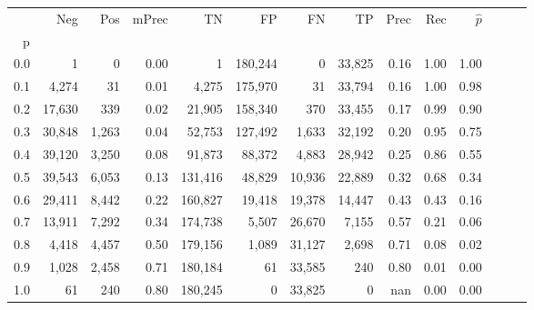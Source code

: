 \begin{tabular}{rrrrrrrrrrrrrr}
\toprule
{} &     Neg &    Pos & mPrec &       TN &       FP &      FN &      TP &  Prec &   Rec & $\hat{p}$ \\
p   &         &        &       &          &          &         &         &       &       &           \\
\midrule
0.0 &       1 &      0 &  0.00 &        1 &  180,244 &       0 &  33,825 &  0.16 &  1.00 &      1.00 \\
0.1 &   4,274 &     31 &  0.01 &    4,275 &  175,970 &      31 &  33,794 &  0.16 &  1.00 &      0.98 \\
0.2 &  17,630 &    339 &  0.02 &   21,905 &  158,340 &     370 &  33,455 &  0.17 &  0.99 &      0.90 \\
0.3 &  30,848 &  1,263 &  0.04 &   52,753 &  127,492 &   1,633 &  32,192 &  0.20 &  0.95 &      0.75 \\
0.4 &  39,120 &  3,250 &  0.08 &   91,873 &   88,372 &   4,883 &  28,942 &  0.25 &  0.86 &      0.55 \\
0.5 &  39,543 &  6,053 &  0.13 &  131,416 &   48,829 &  10,936 &  22,889 &  0.32 &  0.68 &      0.34 \\
0.6 &  29,411 &  8,442 &  0.22 &  160,827 &   19,418 &  19,378 &  14,447 &  0.43 &  0.43 &      0.16 \\
0.7 &  13,911 &  7,292 &  0.34 &  174,738 &    5,507 &  26,670 &   7,155 &  0.57 &  0.21 &      0.06 \\
0.8 &   4,418 &  4,457 &  0.50 &  179,156 &    1,089 &  31,127 &   2,698 &  0.71 &  0.08 &      0.02 \\
0.9 &   1,028 &  2,458 &  0.71 &  180,184 &       61 &  33,585 &     240 &  0.80 &  0.01 &      0.00 \\
1.0 &      61 &    240 &  0.80 &  180,245 &        0 &  33,825 &       0 &   nan &  0.00 &      0.00 \\
\bottomrule
\end{tabular}
